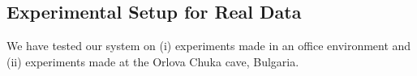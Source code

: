\documentclass{article}
\begin{document}
%
%
%
%
%
%
%
%
%
%
%

\vspace{-5pt}
\subsection{Experimental Setup for Real Data}
\vspace{-5pt}
We have tested our system on (i) experiments made in an office environment and (ii) experiments made at the Orlova Chuka cave, Bulgaria. 
\end{document}
